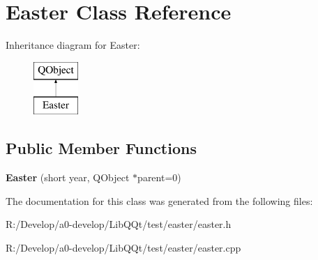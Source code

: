 \hypertarget{class_easter}{}\section{Easter Class Reference}
\label{class_easter}
Inheritance diagram for Easter\+:\begin{figure}[H]
\begin{center}
\leavevmode
\includegraphics[height=2.000000cm]{class_easter}
\end{center}
\end{figure}
\subsection*{Public Member Functions}
\begin{DoxyCompactItemize}
\item 
\mbox{\label{class_easter_a261b59d0abe65d28f0981c1226c86a5f}} 
{\bfseries Easter} (short year, Q\+Object $\ast$parent=0)
\end{DoxyCompactItemize}


The documentation for this class was generated from the following files\+:\begin{DoxyCompactItemize}
\item 
R\+:/\+Develop/a0-\/develop/\+Lib\+Q\+Qt/test/easter/easter.\+h\item 
R\+:/\+Develop/a0-\/develop/\+Lib\+Q\+Qt/test/easter/easter.\+cpp\end{DoxyCompactItemize}
